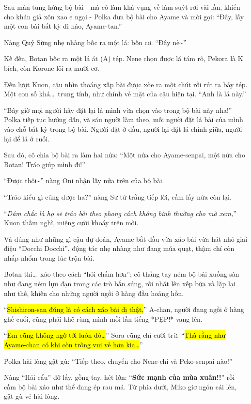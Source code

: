 \documentclass[../main.tex]{subfiles}
\begin{document}
Sau màn tung hứng bộ bài - mà cô làm khá vụng về làm suýt rơi vài lần, khiến cho khán giả xôn xao e ngại - Polka đưa bộ bài cho Ayame và mời gọi: ``Đây, lấy một con bài bất kỳ đi nào, Ayame-tan.''

Nàng Quỷ Sừng nhẹ nhàng bốc ra một lá: bốn cơ. ``Đây nè\~{}''

Kế đến, Botan bốc ra một lá át (A) tép. Nene chọn được lá tám rô, Pekora là K bích, còn Korone lôi ra mười cơ.

Đến lượt Kuon, cậu nhìn thoáng xấp bài được xòe ra một chút rồi rút ra bảy tép. Một con số khá\dots\ trung tính, như chính vẻ mặt của cậu hiện tại. ``Anh là lá này.''

``Bây giờ mọi người hãy đặt lại lá mình vừa chọn vào trong bộ bài này nha!'' Polka tiếp tục hướng dẫn, và sáu người làm theo, mỗi người đặt lá bài của mình vào chỗ bất kỳ trong bộ bài. Người đặt ở đầu, người lại đặt lá chính giữa, người lại để lá ở cuối.

Sau đó, cô chia bộ bài ra làm hai nửa: ``Một nửa cho Ayame-senpai, một nửa cho Botan! Tráo giúp mình đi!''

``Được thôi\~{}'' nàng Oni nhận lấy nửa trên của bộ bài.

``Tráo kiểu gì cũng được ha?'' nàng Sư tử trắng tiếp lời, cầm lấy nửa còn lại.

``\textit{Dám chắc là họ sẽ tráo bài theo phong cách không bình thường cho mà xem,}'' Kuon thầm nghĩ, miệng cười khoáy trên môi.

Và đúng như những gì cậu dự đoán, Ayame bắt đầu vừa xáo bài vừa hát nhỏ giai điệu ``Docchi Docchi'', động tác nhẹ nhàng như đang múa quạt, thậm chí còn nhấp nhổm trong lúc trộn bài.

Botan thì\dots\ xáo theo cách ``hỏi chấm hơn''; cô thẳng tay ném bộ bài xuống sàn như đang ném lựu đạn trong các trò bắn súng, rồi nhăt lên xếp bừa và lặp lại như thế, khiến cho những người ngồi ở hàng đầu hoảng hồn.

``\hl{Shishiron-san đúng là có cách xáo bài dị thật,}'' A-chan, người đang ngồi ở hàng ghế cuối, cũng phải khẽ rùng mình mỗi lần tiếng *PẸP!* vang lên.

``\hl{Em cũng không ngờ tới luôn đó\dots}'' Sora cũng chỉ cười trừ. ``\hl{Thà rằng như Ayame-chan có khi còn trông vui vẻ hơn kìa\dots}''

Polka hài lòng gật gù: ``Tiếp theo, chuyển cho Nene-chi và Peko-senpai nào!''

Nàng ``Hải cẩu'' đỡ lấy, gồng tay, hét lớn: ``\textbf{Sức mạnh của mùa xuân!!}'' rồi cầm bộ bài xáo như thể đang ép rau má. Từ phía dưới, Miko giơ ngón cái lên, gật gù vẻ hài lòng.
\end{document}
